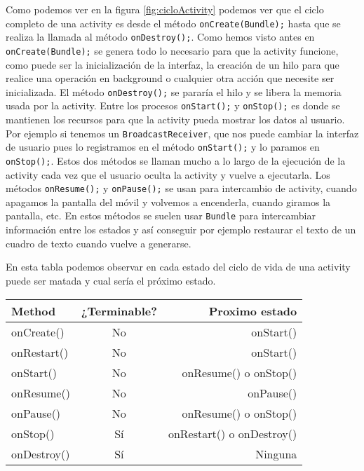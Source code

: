 Como podemos ver en la figura \ref{fig:cicloActivity} podemos ver que el ciclo completo de una activity es desde el método \lstinline{onCreate(Bundle);} hasta que se realiza la llamada al método \lstinline{onDestroy();}. Como hemos visto antes en \lstinline{onCreate(Bundle);} se genera todo lo necesario para que la activity funcione, como puede ser la inicialización de la interfaz, la creación de un hilo para que realice una operación en background o cualquier otra acción que necesite ser inicializada. El método \lstinline{onDestroy();} se pararía el hilo y se libera la memoria usada por la activity. Entre los procesos \lstinline{onStart();} y \lstinline{onStop();} es donde se mantienen los recursos para que la activity pueda mostrar los datos al usuario. Por ejemplo si tenemos un \lstinline{BroadcastReceiver}, que nos puede cambiar la interfaz de usuario pues lo registramos en el método \lstinline{onStart();} y lo paramos en \lstinline{onStop();}. Estos dos métodos se llaman mucho a lo largo de la ejecución de la activity cada vez que el usuario oculta la activity y vuelve a ejecutarla. Los métodos \lstinline{onResume();} y \lstinline{onPause();} se usan para intercambio de activity, cuando apagamos la pantalla del móvil y volvemos a encenderla, cuando giramos la pantalla, etc. En estos métodos se suelen usar \lstinline{Bundle} para intercambiar información entre los estados y así conseguir por ejemplo restaurar el texto de un cuadro de texto cuando vuelve a generarse.

En esta tabla podemos observar en cada estado del ciclo de vida de una activity puede ser matada y cual sería el próximo estado.
\begin{center}
\begin{tabular}{|l | c | r|}

\hline
Method & ¿Terminable? & Proximo estado\\
\hline
onCreate() & No & onStart()\\
\hline
onRestart() & No & onStart()\\
\hline
onStart() & No & onResume() o onStop()\\
\hline
onResume() & No & onPause()\\
\hline
onPause() & No  & onResume() o onStop()\\
\hline
onStop() & Sí & onRestart() o onDestroy()\\
\hline
onDestroy() & Sí & Ninguna\\
\hline

\end{tabular}
\end{center}

